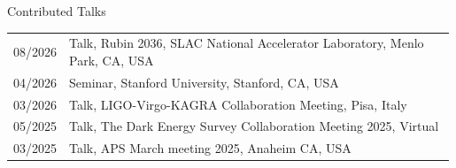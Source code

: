 \begin{rSection}{Contributed Talks}
\setlength{\extrarowheight}{3pt}
\begin{longtable}{p{0.1\linewidth}p{0.89\linewidth}}
08/2026 & Talk, Rubin 2036, SLAC National Accelerator Laboratory, Menlo Park, CA, USA\\ %
04/2026 & Seminar, Stanford University, Stanford, CA, USA \\
03/2026 & Talk, LIGO-Virgo-KAGRA Collaboration Meeting, Pisa, Italy\\ %
05/2025 & Talk, The Dark Energy Survey Collaboration Meeting 2025, Virtual\\ %
03/2025 & Talk, APS March meeting 2025, Anaheim CA, USA\\ %
\end{longtable}
\end{rSection}
